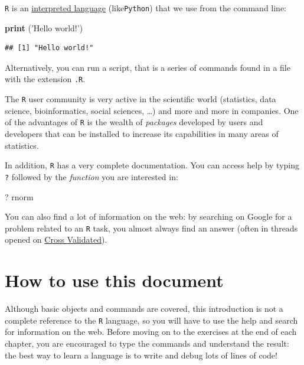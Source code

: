 \documentclass[]{book}
\newenvironment{Shaded}{\begin{snugshade}}{\end{snugshade}}
\newcommand{\KeywordTok}[1]{\textcolor[rgb]{0.13,0.29,0.53}{\textbf{#1}}}
\newcommand{\NormalTok}[1]{#1}
\newcommand{\StringTok}[1]{\textcolor[rgb]{0.31,0.60,0.02}{#1}}
\begin{document}
\texttt{R} is an \href{http://www.france-ioi.org/algo/course.php?idChapter=561\&idCourse=2368}{interpreted language} (like\texttt{Python}) that we use from the command line:

\begin{Shaded}
\begin{Highlighting}[]
\KeywordTok{print}\NormalTok{ (}\StringTok{'Hello world!'}\NormalTok{)}
\end{Highlighting}
\end{Shaded}

\begin{verbatim}
## [1] "Hello world!"
\end{verbatim}

Alternatively, you can run a script, that is a series of commands found in a file with the extension \texttt{.R}.

The \texttt{R} user community is very active in the scientific world (statistics, data science, bioinformatics, social sciences, \ldots{}) and more and more in companies. One of the advantages of \texttt{R} is the wealth of \emph{packages} developed by users and developers that can be installed to increase its capabilities in many areas of statistics.

In addition, \texttt{R} has a very complete documentation. You can access help by typing \texttt{?} followed by the \emph{function} you are interested in:

\begin{Shaded}
\begin{Highlighting}[]
\NormalTok{? rnorm}
\end{Highlighting}
\end{Shaded}

You can also find a lot of information on the web: by searching on Google for a problem related to an \texttt{R} task, you almost always find an answer (often in threads opened on \href{https:\%20//\%20stats\%20.stackexchange.com\%20/}{Cross Validated}).

\hypertarget{how-to-use-this-document}{%
\section{How to use this document}\label{how-to-use-this-document}}

Although basic objects and commands are covered, this introduction is not a complete reference to the \texttt{R} language, so you will have to use the help and search for information on the web. Before moving on to the exercises at the end of each chapter, you are encouraged to type the commands and understand the result: the best way to learn a language is to write and debug lots of lines of code!
\end{document}

